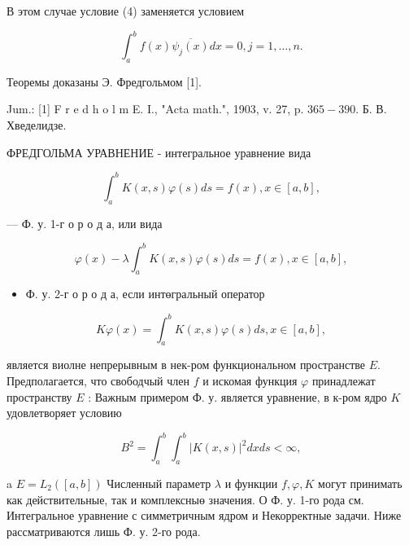 \documentclass[10pt]{article}
\begin{document}
В этом случае условие (4) заменяется условием



\[

\int_{a}^{b} f(x) \overline{\psi_{j}(x)} d x=0, j=1, \ldots, n .

\]



Теоремы доказаны Э. Фредгольмом [1].



Jum.: [1] F r e d h o l m E. I., "Acta math.", 1903, v. 27, p. $365-390$. Б. В. Хведелидзе.



ФРЕДГОЛЬМА УРАВНЕНИЕ - интегральное уравнение вида



\[

\int_{a}^{b} K(x, s) \varphi(s) d s=f(x), x \in[a, b],

\]



— Ф. у. 1-г о р о д а, или вида



\[

\varphi(x)-\lambda \int_{a}^{b} K(x, s) \varphi(s) d s=f(x), x \in[a, b],

\]



\begin{itemize}

  \item Ф. у. 2-г о р о д а, если интөгральный оператор

\end{itemize}



\[

K \varphi(x)=\int_{a}^{b} K(x, s) \varphi(s) d s, x \in[a, b],

\]



является виолне непрерывным в нек-ром функциональном пространстве $E$. Предполагается, что свободчый член $f$ и искомая функция $\varphi$ принадлежат пространству $E$ : Важным примером Ф. у. является уравнение, в к-ром ядро $K$ удовлетворяет условию



\[

B^{2}=\int_{a}^{b} \int_{a}^{b}|K(x, s)|^{2} d x d s<\infty,

\]



a $E=L_{2}([a, b])$ Численный параметр $\lambda$ и функции $f, \varphi, K$ могут принимать как действительные, так и комплексныө значения. О Ф. у. 1-го рода см. Интегральное уравнение с симметричным ядром и Некорректные задачи. Ниже рассматриваются лишь Ф. у. 2-го рода.
\end{document}
